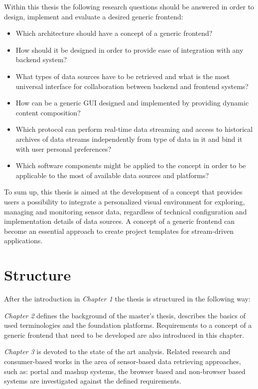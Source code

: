        Within this thesis the following research questions should be answered in order to design, implement and evaluate a desired generic frontend: 
       \begin{itemize}
       \item Which architecture should have a concept of a generic frontend?
       \item How should it be designed in order to provide ease of integration with any backend system?
       \item What types of data sources have to be retrieved and what is the most universal interface for collaboration between backend and frontend systems?
       \item How can be a generic GUI designed and implemented by providing dynamic content composition?
       \item Which protocol can perform real-time data streaming and access to historical archives of data streams independently from type of data in it and bind it with user personal preferences?
       \item Which software components might be applied to the concept in order to be applicable to the most of available data sources and platforms?
       \end{itemize}

     To sum up, this thesis is aimed at the development of a concept that provides users a possibility to integrate a personalized visual environment for exploring, managing and monitoring sensor data, regardless of technical configuration and implementation details of data sources. A concept of a generic frontend can become an essential approach to create project templates for stream-driven applications.

\section{Structure}

After the introduction in \emph{Chapter 1} the thesis is structured in the following way:

\emph{Chapter 2} defines the background of the master's thesis, describes the basics of used terminologies and the foundation platforms. Requirements to a concept of a generic frontend that need to be developed are also introduced in this chapter.

\emph{Chapter 3} is devoted to the state of the art analysis. Related research and consumer-based works in the area of sensor-based data retrieving approaches, such as: portal and mashup systems, the browser based and non-browser based systems are investigated against the defined requirements.

